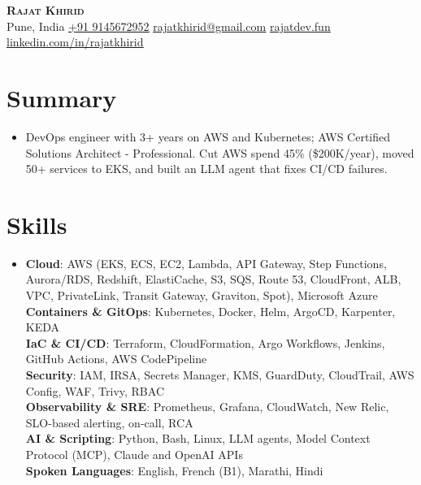 \documentclass[a4paper,11pt]{article}
\newcommand{\AWS}{A{}WS}
\newcommand{\WAF}{W{}AF}
\newcommand{\contactsep}{\hspace{5pt}\textbar\hspace{5pt}}
\begin{document}
\begin{center}
    \textbf{\Huge \scshape Rajat Khirid} \\ \vspace{8pt}
    \small
    Pune, India\contactsep
    \href{tel:+919145672952}{\underline{+91 9145672952}}\contactsep
    \href{mailto:rajatkhirid@gmail.com}{\underline{rajatkhirid@gmail.com}}\contactsep
    \href{https://rajatdev.fun/}{\underline{rajatdev.fun}}\contactsep
    \href{https://linkedin.com/in/rajatkhirid}{\underline{linkedin.com/in/rajatkhirid}}
\end{center}

\section{Summary}
\begin{itemize}[leftmargin=0.15in, label={}]
  \small\item
  DevOps engineer with 3+ years on \AWS{} and Kubernetes; \AWS{} Certified Solutions Architect - Professional. Cut \AWS{} spend 45\% (\$200K/year), moved 50+ services to EKS, and built an LLM agent that fixes CI/CD failures.
\end{itemize}

\section{Skills}
\begin{itemize}[leftmargin=0.15in, label={}]
    \small\item
    \textbf{Cloud}: \AWS{} (EKS, ECS, EC2, Lambda, API Gateway, Step Functions, Aurora/RDS, Redshift, ElastiCache, S3, SQS, Route 53, CloudFront, ALB, VPC, PrivateLink, Transit Gateway, Graviton, Spot), Microsoft Azure \\
    \textbf{Containers \& GitOps}: Kubernetes, Docker, Helm, ArgoCD, Karpenter, KEDA \\
    \textbf{IaC \& CI/CD}: Terraform, CloudFormation, Argo Workflows, Jenkins, GitHub Actions, \AWS{} CodePipeline \\
    \textbf{Security}: IAM, IRSA, Secrets Manager, KMS, GuardDuty, CloudTrail, \AWS{} Config, \WAF{}, Trivy, RBAC \\
    \textbf{Observability \& SRE}: Prometheus, Grafana, CloudWatch, New Relic, SLO-based alerting, on-call, RCA \\
    \textbf{AI \& Scripting}: Python, Bash, Linux, LLM agents, Model Context Protocol (MCP), Claude and OpenAI APIs \\
    \textbf{Spoken Languages}: English, French (B1), Marathi, Hindi
\end{itemize}
\end{document}
